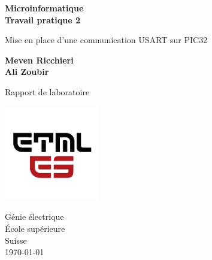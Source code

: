 \begin{titlepage}
   \begin{center}
        \vspace*{1cm}
        \LARGE
        \textbf{Microinformatique \\ Travail pratique 2}
        
        \vspace{0.3cm}
       	Mise en place d'une communication USART sur PIC32
            
        \vspace{1.5cm}

        \textbf{Meven Ricchieri \\ Ali Zoubir}

        \vfill
            
        Rapport de  laboratoire
            
        \vspace{0.8cm}
     
        \includegraphics[width=0.31\textwidth]{./ETML-ES-LOGO.png}

        Génie électrique\\
        École supérieure\\
        Suisse\\
        \monthyeardate\today
            
   \end{center}
\end{titlepage}